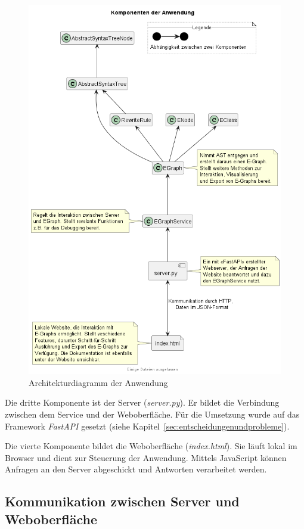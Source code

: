 \begin{figure}[H]
  \centering
  \includegraphics[scale=0.6]{../fig/components.png}
  \caption{Architekturdiagramm der Anwendung}
  \label{fig:architektur}
\end{figure}

Die dritte Komponente ist der Server (\textit{server.py}). Er bildet die Verbindung zwischen dem Service und der Weboberfläche. Für die Umsetzung wurde auf das Framework 
\textit{FastAPI} gesetzt (siehe Kapitel~\ref{sec:entscheidungenundprobleme}). 

Die vierte Komponente bildet die Weboberfläche (\textit{index.html}). Sie läuft lokal im Browser und dient zur Steuerung der Anwendung. Mittels JavaScript können Anfragen an den
Server abgeschickt und Antworten verarbeitet werden.

\subsection{Kommunikation zwischen Server und Weboberfläche}

